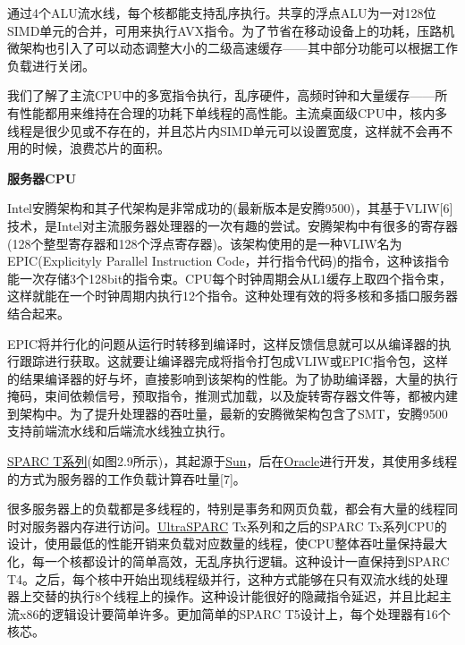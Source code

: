 通过4个ALU流水线，每个核都能支持乱序执行。共享的浮点ALU为一对128位SIMD单元的合并，可用来执行AVX指令。为了节省在移动设备上的功耗，压路机微架构也引入了可以动态调整大小的二级高速缓存——其中部分功能可以根据工作负载进行关闭。

我们了解了主流CPU中的多宽指令执行，乱序硬件，高频时钟和大量缓存——所有性能都用来维持在合理的功耗下单线程的高性能。主流桌面级CPU中，核内多线程是很少见或不存在的，并且芯片内SIMD单元可以设置宽度，这样就不会再不用的时候，浪费芯片的面积。

\textbf{服务器CPU}

Intel安腾架构和其子代架构是非常成功的(最新版本是安腾9500)，其基于VLIW[6]技术，是Intel对主流服务器处理器的一次有趣的尝试。安腾架构中有很多的寄存器(128个整型寄存器和128个浮点寄存器)。该架构使用的是一种VLIW名为EPIC(Explicityly Parallel Instruction Code，并行指令代码)的指令，这种该指令能一次存储3个128bit的指令束。CPU每个时钟周期会从L1缓存上取四个指令束，这样就能在一个时钟周期内执行12个指令。这种处理有效的将多核和多插口服务器结合起来。

EPIC将并行化的问题从运行时转移到编译时，这样反馈信息就可以从编译器的执行跟踪进行获取。这就要让编译器完成将指令打包成VLIW或EPIC指令包，这样的结果编译器的好与坏，直接影响到该架构的性能。为了协助编译器，大量的执行掩码，束间依赖信号，预取指令，推测式加载，以及旋转寄存器文件等，都被内建到架构中。为了提升处理器的吞吐量，最新的安腾微架构包含了SMT，安腾9500支持前端流水线和后端流水线独立执行。

\href{https://en.wikipedia.org/wiki/SPARC\_T-Series}{SPARC T系列}(如图2.9所示)，其起源于\href{https://zh.wikipedia.org/wiki/\%E6\%98\%87\%E9\%99\%BD}{Sun}，后在\href{https://zh.wikipedia.org/wiki/\%E7\%94\%B2\%E9\%AA\%A8\%E6\%96\%87\%E5\%85\%AC\%E5\%8F\%B8}{Oracle}进行开发，其使用多线程的方式为服务器的工作负载计算吞吐量[7]。

很多服务器上的负载都是多线程的，特别是事务和网页负载，都会有大量的线程同时对服务器内存进行访问。\href{https://zh.wikipedia.org/wiki/SPARC}{UltraSPARC} Tx系列和之后的SPARC Tx系列CPU的设计，使用最低的性能开销来负载对应数量的线程，使CPU整体吞吐量保持最大化，每一个核都设计的简单高效，无乱序执行逻辑。这种设计一直保持到SPARC T4。之后，每个核中开始出现线程级并行，这种方式能够在只有双流水线的处理器上交替的执行8个线程上的操作。这种设计能很好的隐藏指令延迟，并且比起主流x86的逻辑设计要简单许多。更加简单的SPARC T5设计上，每个处理器有16个核芯。


